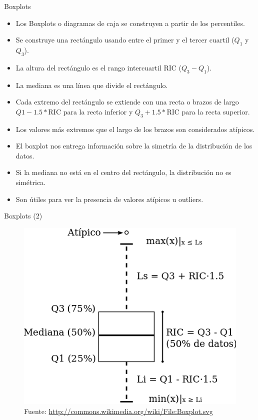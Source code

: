 \documentclass[handout]{beamer}
\begin{document}
\begin{frame}[fragile]{Boxplots}
\scriptsize{
\begin{itemize}
 \item Los Boxplots o diagramas de caja se construyen a partir de los percentiles. 
 \item Se construye una rectángulo usando entre el primer y el tercer cuartil ($Q_1$ y $Q_3$).
 \item La altura del rectángulo es el rango intercuartil RIC ($Q_3 - Q_1$).
 \item La mediana es una línea que divide el rectángulo.
 \item Cada extremo del rectángulo se extiende con una recta o brazos de largo $Q1-1.5*$RIC para la recta inferior y  $Q_3+1.5*$RIC para la recta superior.
 \item Los valores más extremos que el largo de los brazos son considerados atípicos.
 
 \item El boxplot nos entrega información sobre la simetría de la distribución de los datos.
  \item Si la mediana no está en el centro del rectángulo, la distribución no es simétrica.
 \item Son útiles para ver la presencia de valores atípicos u outliers.
 
\end{itemize}



}
\end{frame}


\begin{frame}{Boxplots (2)}
\begin{figure}[h!]
	\centering
	\includegraphics[scale=0.35]{pics/boxplot.png}
	\caption{Fuente: \url{http://commons.wikimedia.org/wiki/File:Boxplot.svg}}
	
\end{figure} 
\end{frame}
\end{document}
